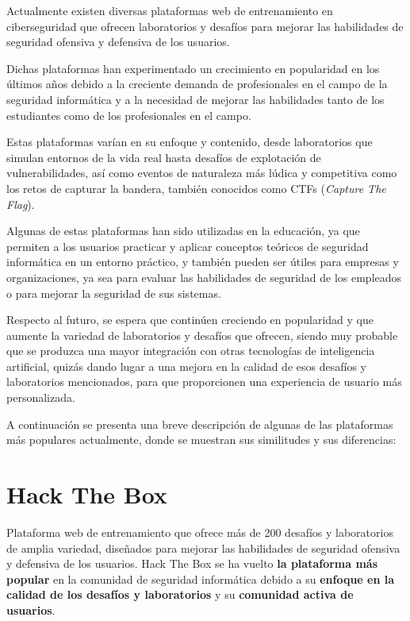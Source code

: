     Actualmente existen diversas plataformas web de entrenamiento en ciberseguridad que ofrecen laboratorios y desafíos para mejorar las habilidades de seguridad ofensiva y defensiva de los usuarios.
    
    Dichas plataformas han experimentado un crecimiento en popularidad en los últimos años debido a la creciente demanda de profesionales en el campo de la seguridad informática y a la necesidad de mejorar las habilidades tanto de los estudiantes como de los profesionales en el campo.
    
    Estas plataformas varían en su enfoque y contenido, desde laboratorios que simulan entornos de la vida real hasta desafíos de explotación de vulnerabilidades, así como eventos de naturaleza más lúdica y competitiva como los retos de capturar la bandera, también conocidos como CTFs (\textit{Capture The Flag}).
    
    Algunas de estas plataformas han sido utilizadas en la educación, ya que permiten a los usuarios practicar y aplicar conceptos teóricos de seguridad informática en un entorno práctico, y también pueden ser útiles para empresas y organizaciones, ya sea para evaluar las habilidades de seguridad de los empleados o para mejorar la seguridad de sus sistemas.
    
    Respecto al futuro, se espera que continúen creciendo en popularidad y que aumente la variedad de laboratorios y desafíos que ofrecen, siendo muy probable que se produzca una mayor integración con otras tecnologías de inteligencia artificial, quizás dando lugar a una mejora en la calidad de esos desafíos y laboratorios mencionados, para que proporcionen una experiencia de usuario más personalizada.
    
    A continuación se presenta una breve descripción de algunas de las plataformas más populares actualmente, donde se muestran sus similitudes y sus diferencias:
    
    \newpage
    
    
    \section{Hack The Box}
    
        Plataforma web de entrenamiento que ofrece más de 200 desafíos y laboratorios de amplia variedad, diseñados para mejorar las habilidades de seguridad ofensiva y defensiva de los usuarios. Hack The Box se ha vuelto \textbf{la plataforma más popular} en la comunidad de seguridad informática debido a su \textbf{enfoque en la calidad de los desafíos y laboratorios} y su \textbf{comunidad activa de usuarios}.
        
